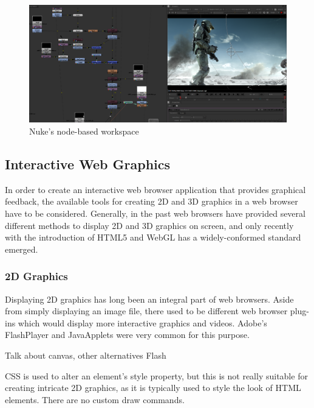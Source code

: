 \documentclass[a4paper,11pt,titlepage]{article}
\begin{document}
\begin{figure}[ht!]
\centering
\includegraphics[width=170mm]{graphics/nuke_02.png}
\caption{Nuke's node-based workspace}
\label{fig:UIdesign1}
\end{figure}


\subsection{Interactive Web Graphics}

In order to create an interactive web browser application that provides graphical feedback, the available tools for creating 2D and 3D graphics in a web browser have to be considered. Generally, in the past web browsers have provided several different methods to display 2D and 3D graphics on screen, and only recently with the introduction of HTML5 and WebGL has a widely-conformed standard emerged.

\subsubsection{2D Graphics}

Displaying 2D graphics has long been an integral part of web browsers. Aside from simply displaying an image file, there used to be different web browser plug-ins which would display more interactive graphics and videos. Adobe's FlashPlayer and JavaApplets were very common for this purpose.


Talk about canvas, other alternatives
Flash

CSS is used to alter an element's style property, but this is not really suitable for creating intricate 2D graphics, as it is typically used to style the look of HTML elements. There are no custom draw commands.
\end{document}
